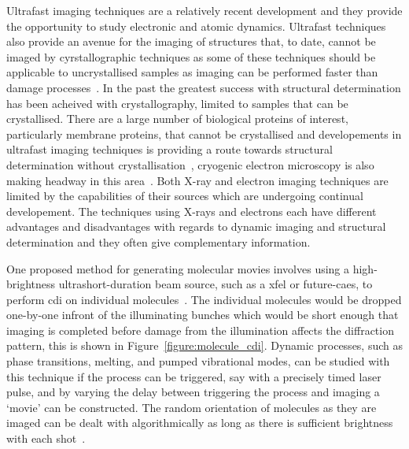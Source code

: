 Ultrafast imaging techniques are a relatively recent development and they provide the opportunity to study electronic and atomic dynamics.
Ultrafast techniques also provide an avenue for the imaging of structures that, to date, cannot be imaged by cyrstallographic techniques as some of these techniques should be applicable to uncrystallised samples as imaging can be performed faster than damage processes~\cite{gaffney_imaging_2007,barty_ultrafast_2008,miao_beyond_2015}.
In the past the greatest success with structural determination has been acheived with crystallography, limited to samples that can be crystallised.
There are a large number of biological proteins of interest, particularly membrane proteins, that cannot be crystallised and developements in ultrafast imaging techniques is providing a route towards structural determination without crystallisation~\cite{dauter_current_2006,levitt_nature_2009}, cryogenic electron microscopy is also making headway in this area~\cite{henderson_model_1990,zhou_towards_2008}.
Both X-ray and electron imaging techniques are limited by the capabilities of their sources which are undergoing continual developement.
The techniques using X-rays and electrons each have different advantages and disadvantages with regards to dynamic imaging and structural determination and they often give complementary information.

One proposed method for generating molecular movies involves using a high-brightness ultrashort-duration beam source, such as a \gls{xfel} or future-\gls{caes}, to perform \gls{cdi} on individual molecules~\cite{chapman_femtosecond_2006,dwyer_femtosecond_2006,gaffney_imaging_2007}.
The individual molecules would be dropped one-by-one infront of the illuminating bunches which would be short enough that imaging is completed before damage from the illumination affects the diffraction pattern, this is shown in Figure~\ref{figure:molecule_cdi}.
Dynamic processes, such as phase transitions, melting, and pumped vibrational modes, can be studied with this technique if the process can be triggered, say with a precisely timed laser pulse, and by varying the delay between triggering the process and imaging a `movie' can be constructed.
The random orientation of molecules as they are imaged can be dealt with algorithmically as long as there is sufficient brightness with each shot~\cite{yefanov_orientation_2013}.


